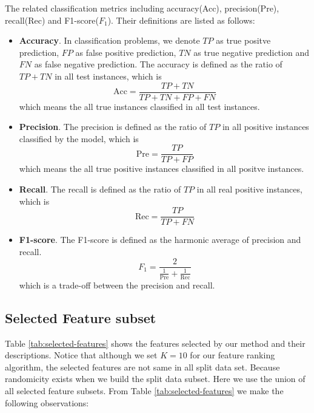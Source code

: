 \documentclass{ieeeaccess}
\theoremstyle{definition}
\begin{document}
The related classification metrics including accuracy(Acc), precision(Pre), recall(Rec) and F1-score($F_1$). Their definitions are listed as follows:

\begin{itemize}
    \item \textbf{Accuracy}. In classification problems, we denote $TP$ as true positve prediction, $FP$ as false positive prediction, $TN$ as true negative prediction and $FN$ as false negative prediction. The accuracy is defined as the ratio of $TP+TN$ in all test instances, which is
    \begin{equation}
        \text{Acc}=\frac{TP+TN}{TP+TN+FP+FN}
    \end{equation}
    which means the all true instances classified in all test instances.
    \item \textbf{Precision}. The precision is defined as the ratio of $TP$ in all positive instances classified by the model, which is
    \begin{equation}
        \text{Pre} = \frac{TP}{TP+FP}
    \end{equation}
    which means the all true positive instances classified in all positve instances.

    \item \textbf{Recall}. The recall is defined as the ratio of $TP$ in all real positive instances, which is
    \begin{equation}
        \text{Rec} = \frac{TP}{TP+FN}
    \end{equation}
    
    \item \textbf{F1-score}. The F1-score is defined as the harmonic average of precision and recall.
    \begin{equation}
        F_1 = \frac{2}{\frac{1}{\text{Pre}} + \frac{1}{\text{Rec}}}
    \end{equation}
    which is a trade-off between the precision and recall.
\end{itemize}

\subsection{Selected Feature subset}

Table \ref{tab:selected-features} shows the features selected by our method and their descriptions. Notice that although we set $K=10$ for our feature ranking algorithm, the selected features are not same in all split data set. Because randomicity exists when we build the split data subset. Here we use the union of all selected feature subsets. From Table \ref{tab:selected-features} we make the following observations:
\end{document}
